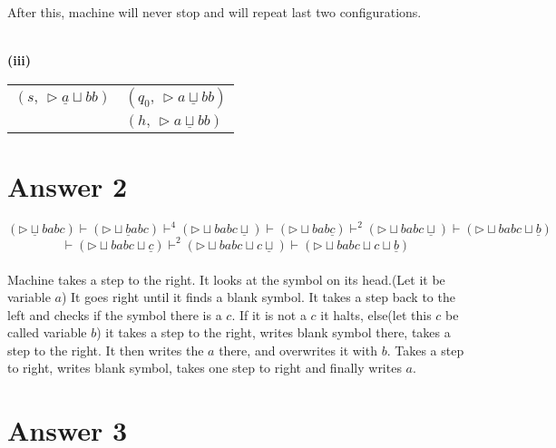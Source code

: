 \documentclass[12pt]{article}
\begin{document}
  \begin{minipage}{0.4\textwidth}
    After this, machine will never stop and will repeat last two configurations.
  \end{minipage}\\
  \textbf{(iii)}
  \begin{minipage}{0.4\textwidth}
    \begin{table}[H]
      \begin{tabular}{ll}
        $(s,\,\triangleright \underline{a}\sqcup bb)$ & $(q_0,\,\triangleright a\underline{\sqcup}bb)$ \\
                                                      & $(h,\,\triangleright a\underline{\sqcup}bb)$  
      \end{tabular}
    \end{table}
  \end{minipage}
  \newpage


\section*{Answer 2}

  $$(\triangleright\underline{\sqcup} babc)\vdash(\triangleright\sqcup\underline{b}abc)\vdash^4(\triangleright\sqcup babc\underline{\sqcup})\vdash(\triangleright\sqcup bab\underline{c})\vdash^2(\triangleright\sqcup babc\underline{\sqcup})\vdash(\triangleright\sqcup babc\sqcup\underline{b})$$
  $$\vdash(\triangleright\sqcup babc\sqcup\underline{c})\vdash^2(\triangleright\sqcup babc\sqcup c\underline{\sqcup})\vdash(\triangleright\sqcup babc\sqcup c\sqcup\underline{b})$$\\

  \qquad Machine takes a step to the right. It looks at the symbol on its head.(Let it be variable $a$) It goes right until it finds a blank symbol. It takes a step back to the left and checks if the symbol there is a $c$. If it is not a $c$ it halts, else(let this $c$ be called variable $b$) it takes a step to the right, writes blank symbol there, takes a step to the right. It then writes the $a$ there, and overwrites it with $b$. Takes a step to right, writes blank symbol, takes one step to right and finally writes $a$.


\section*{Answer 3}
\end{document}
